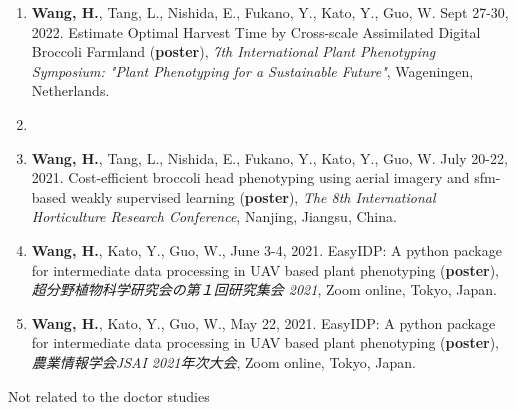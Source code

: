 \begin{singlespace}
\begin{enumerate}
  \item \textbf{Wang, H.}, Tang, L., Nishida, E., Fukano, Y., Kato, Y., Guo, W. Sept 27-30, 2022. Estimate Optimal Harvest Time by Cross-scale Assimilated Digital Broccoli Farmland (\textbf{poster}), \textit{7th International Plant Phenotyping Symposium: "Plant Phenotyping for a Sustainable Future"}, Wageningen, Netherlands.
  \item {}
  \item \textbf{Wang, H.}, Tang, L., Nishida, E., Fukano, Y., Kato, Y., Guo, W. July 20-22, 2021. Cost-efficient broccoli head phenotyping using aerial imagery and \gls{sfm}-based weakly supervised learning (\textbf{poster}), \textit{The 8th International Horticulture Research Conference}, Nanjing, Jiangsu, China.
  \item \textbf{Wang, H.}, Kato, Y., Guo, W., June 3-4, 2021. EasyIDP: A python package for intermediate data processing in UAV based plant phenotyping (\textbf{poster}), \textit{超分野植物科学研究会の第１回研究集会 2021}, Zoom online, Tokyo, Japan.
  \item \textbf{Wang, H.}, Kato, Y., Guo, W., May 22, 2021. EasyIDP: A python package for intermediate data processing in UAV based plant phenotyping (\textbf{poster}), \textit{農業情報学会JSAI 2021年次大会}, Zoom online, Tokyo, Japan.
\end{enumerate}

\noindent
Not related to the doctor studies


\end{singlespace}
